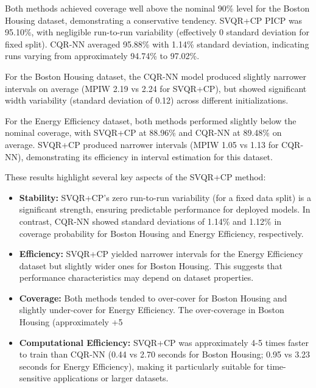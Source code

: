 \documentclass{article}
\begin{document}
Both methods achieved coverage well above the nominal 90\% level for the Boston Housing dataset, demonstrating a conservative tendency. SVQR+CP PICP was 95.10\%, with negligible run-to-run variability (effectively 0 standard deviation for fixed split). CQR-NN averaged 95.88\% with 1.14\% standard deviation, indicating runs varying from approximately 94.74\% to 97.02\%. 

For the Boston Housing dataset, the CQR-NN model produced slightly narrower intervals on average (MPIW 2.19 vs 2.24 for SVQR+CP), but showed significant width variability (standard deviation of 0.12) across different initializations.

For the Energy Efficiency dataset, both methods performed slightly below the nominal coverage, with SVQR+CP at 88.96\% and CQR-NN at 89.48\% on average. SVQR+CP produced narrower intervals (MPIW 1.05 vs 1.13 for CQR-NN), demonstrating its efficiency in interval estimation for this dataset.

These results highlight several key aspects of the SVQR+CP method:

\begin{itemize}[noitemsep, topsep=0pt]
    \item \textbf{Stability:} SVQR+CP's zero run-to-run variability (for a fixed data split) is a significant strength, ensuring predictable performance for deployed models. In contrast, CQR-NN showed standard deviations of 1.14\% and 1.12\% in coverage probability for Boston Housing and Energy Efficiency, respectively.
    
    \item \textbf{Efficiency:} SVQR+CP yielded narrower intervals for the Energy Efficiency dataset but slightly wider ones for Boston Housing. This suggests that performance characteristics may depend on dataset properties.
    
    \item \textbf{Coverage:} Both methods tended to over-cover for Boston Housing and slightly under-cover for Energy Efficiency. The over-coverage in Boston Housing (approximately +5%
    
    \item \textbf{Computational Efficiency:} SVQR+CP was approximately 4-5 times faster to train than CQR-NN (0.44 vs 2.70 seconds for Boston Housing; 0.95 vs 3.23 seconds for Energy Efficiency), making it particularly suitable for time-sensitive applications or larger datasets.
\end{itemize}
\end{document}
